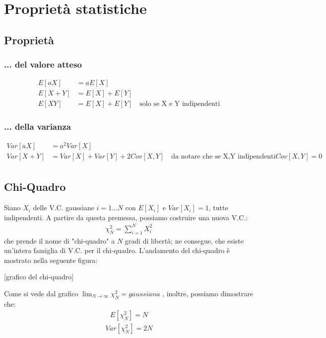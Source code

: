\chapter{Proprietà statistiche}
\section{Proprietà}
\subsection{... del valore atteso }
  \begin{align*}
    E[aX]&=aE[X]\\
    E[X+Y]&=E[X]+E[Y]\\
    E[XY]&=E[X]+E[Y] \quad \text{solo se X e Y indipendenti}
  \end{align*}
\subsection{... della varianza}
  \begin{align*}
    Var[aX]&=a^2Var[X]\\
    Var[X+Y]&=Var[X]+Var[Y]+2Cov[X,Y] \quad \text{da notare che se X,Y indipendenti} Cov[X,Y]=0\\
  \end{align*}
\section{Chi-Quadro}
Siano $X_i$ delle V.C. gaussiane $i=1...N$ con $E[X_i]$ e $Var[X_i]=1$, tutte indipendenti. A partire da questa premessa, possiamo costruire una nuova V.C.:
  \begin{align*}
    \chi_N^2=\sum_{i=1}^{N}{X_i^2}
  \end{align*}
che prende il nome di "chi-quadro" a $N$ gradi di libertà; ne consegue, che esiste un'intera famiglia di V.C. per il chi-quadro. L'andamento del chi-quadro è mostrato nella seguente figura:\newline

\begin{center}[grafico del chi-quadro]\end{center}

Come si vede dal grafico $\lim_{N\rightarrow\infty}{\chi_N^2}=gaussiana$ , inoltre, possiamo dimostrare che:
  \begin{align*}
    E[\chi_N^2]=N
  \end{align*}
  \begin{align*}
    Var[\chi_N^2]=2N
  \end{align*}
